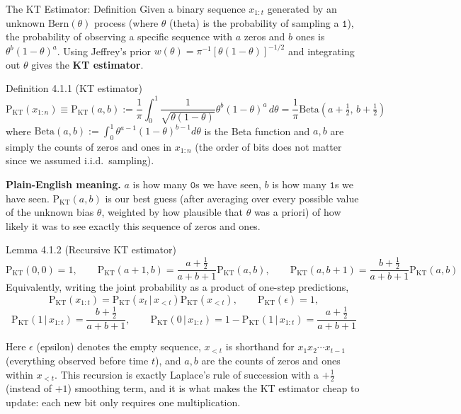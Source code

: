 \documentclass[aspectratio=169,10pt]{beamer}
\newcommand{\PKT}{\mathrm{P}_{\mathrm{KT}}}
\begin{document}
\begin{frame}[allowframebreaks]{The KT Estimator: Definition}
Given a binary sequence $x_{1:t}$ generated by an unknown $\mathrm{Bern}(\theta)$ process
(where $\theta$ (theta) is the probability of sampling a $\mathtt{1}$), the probability of
observing a specific sequence with $a$ zeros and $b$ ones is $\theta^b(1-\theta)^a$. Using
Jeffrey's prior $w(\theta) = \pi^{-1}[\theta(1-\theta)]^{-1/2}$ and integrating out
$\theta$ gives the \textbf{KT estimator}.

\begin{block}{Definition 4.1.1 (KT estimator)}
$$
\PKT(x_{1:n}) \equiv \PKT(a,b) := \frac{1}{\pi}\int_0^1 \frac{1}{\sqrt{\theta(1-\theta)}}
\theta^b(1-\theta)^a\,d\theta = \frac{1}{\pi}\mathrm{Beta}\left(a+\tfrac12,\,b+\tfrac12\right)
$$
where $\mathrm{Beta}(a,b):=\int_0^1\theta^{a-1}(1-\theta)^{b-1}d\theta$ is the Beta
function and $a,b$ are simply the counts of zeros and ones in $x_{1:n}$ (the order of
bits does not matter since we assumed i.i.d.\ sampling).
\end{block}

\textbf{Plain-English meaning.} $a$ is how many $\mathtt{0}$s we have seen, $b$ is how many
$\mathtt{1}$s we have seen. $\PKT(a,b)$ is our best guess (after averaging over every
possible value of the unknown bias $\theta$, weighted by how plausible that $\theta$ was a
priori) of how likely it was to see exactly this sequence of zeros and ones.

\framebreak

\begin{block}{Lemma 4.1.2 (Recursive KT estimator)}
$$
\PKT(0,0)=1,\qquad
\PKT(a+1,b)=\frac{a+\tfrac12}{a+b+1}\PKT(a,b),\qquad
\PKT(a,b+1)=\frac{b+\tfrac12}{a+b+1}\PKT(a,b)
$$
Equivalently, writing the joint probability as a product of one-step predictions,
$$
\PKT(x_{1:t}) = \PKT(x_t\,|\,x_{<t})\PKT(x_{<t}), \qquad \PKT(\epsilon)=1,
$$
$$
\PKT(1\,|\,x_{1:t}) = \frac{b+\tfrac12}{a+b+1}, \qquad
\PKT(0\,|\,x_{1:t}) = 1-\PKT(1\,|\,x_{1:t}) = \frac{a+\tfrac12}{a+b+1}
$$
\end{block}
Here $\epsilon$ (epsilon) denotes the empty sequence, $x_{<t}$ is shorthand for
$x_1x_2\cdots x_{t-1}$ (everything observed before time $t$), and $a,b$ are the counts of
zeros and ones within $x_{<t}$. This recursion is exactly Laplace's rule of succession with
a $+\tfrac12$ (instead of $+1$) smoothing term, and it is what makes the KT estimator cheap
to update: each new bit only requires one multiplication.

\framebreak


\end{frame}
\end{document}
